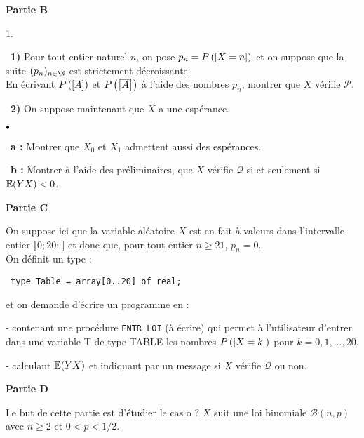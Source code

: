 \documentclass[11pt]{article}%
\begin{document}
\textbf{Partie B}

\begin{noliste}{1.}
 \setlength{\itemsep}{4mm}
\item[ \ \textbf{1)}] Pour tout entier naturel $n$, on pose $p_{n} =
P\left(\left[ {X = n} \right]\right)$ et
on suppose que la suite $(p_{n})_{n\in \N}$ est strictement
décroissante.\\
En écrivant $P\left(\left[ {A} \right]\right)$ et $P\left(\left[ {\overline{A}} \right]\right)$
à l'aide des nombres $p_{n}$, montrer que $X$ vérifie $\mathcal{P}$.

\item[ \ \textbf{2)}] On suppose maintenant que $X$ a une espérance.

\begin{noliste}{$\scriptstyle \bullet$}
\item[ \ \textbf{a :}] Montrer que $X_{0}$ et $X_{1}$ admettent aussi
des espérances.

\item[ \ \textbf{b :}] Montrer à l'aide des préliminaires, que $X$
vérifie $\mathcal{Q}$ si et seulement si $\mathbb{E}(YX)<0$.
\end{noliste}
\end{noliste}

\textbf{Partie C}

\noindent On suppose ici que la variable aléatoire $X$ est en
fait à valeurs dans l'intervalle entier $ \llbracket 0 ; 20 :\rrbracket
$ et donc que, pour tout entier $n \geq 21$, $p_{n} = 0$.\\
On définit un type :
\begin{verbatim}
 type Table = array[0..20] of real;
\end{verbatim}

et on demande d'écrire un programme en \Scilab{} :

- contenant une procédure \texttt{ENTR\E\_{L}OI} (à écrire) qui permet
à l'utilisateur d'entrer dans une variable T de type TABLE les nombres
$P\left(\left[ {X = k} \right]\right)$ pour $k = 0,1,\ldots,20$.

- calculant $\mathbb{E}(Y X)$ et indiquant par un message si $X$ vérifie
$\mathcal{Q}$ ou non.

\vspace{0.5cm} \textbf{Partie D}

\noindent Le but de cette partie est d'étudier le cas o ? $X$ suit
une loi binomiale $\mathcal{B}(n,p)$ avec $n \geq 2$ et $0<p<1/2$.
\end{document}
